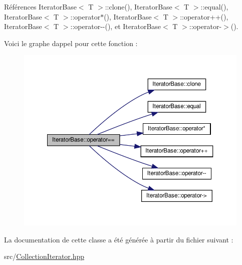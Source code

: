 Références Iterator\+Base$<$ T $>$\+::clone(), Iterator\+Base$<$ T $>$\+::equal(), Iterator\+Base$<$ T $>$\+::operator$\ast$(), Iterator\+Base$<$ T $>$\+::operator++(), Iterator\+Base$<$ T $>$\+::operator-\/-\/(), et Iterator\+Base$<$ T $>$\+::operator-\/$>$().

Voici le graphe d\textquotesingle{}appel pour cette fonction \+:\nopagebreak
\begin{figure}[H]
\begin{center}
\leavevmode
\includegraphics[width=350pt]{class_iterator_base_a7475728422cb73f91d1c4cb4c3d07499_cgraph}
\end{center}
\end{figure}


La documentation de cette classe a été générée à partir du fichier suivant \+:\begin{DoxyCompactItemize}
\item 
src/\hyperlink{_collection_iterator_8hpp}{Collection\+Iterator.\+hpp}\end{DoxyCompactItemize}
